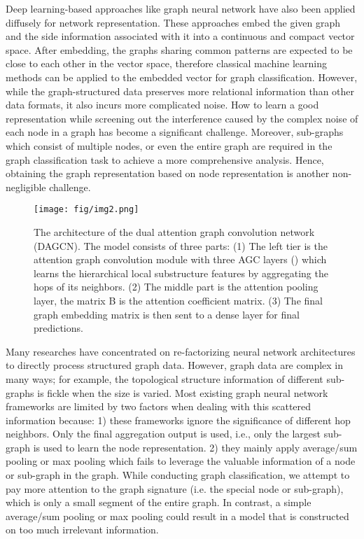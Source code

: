 \documentclass[conference]{IEEEtran}
\begin{document}
	     Deep learning-based approaches like graph neural network have also been applied diffusely for network representation. These approaches embed the given graph and the side information associated with it into a continuous and compact vector space. After embedding, the graphs sharing common patterns are expected to be close to each other in the vector space, therefore classical machine learning methods can be applied to the embedded vector for graph classification. However, while the graph-structured data preserves more relational information than other data formats, it also incurs more complicated noise. How to learn a good representation while screening out the interference caused by the complex noise of each node in a graph has become a significant challenge. Moreover, sub-graphs which consist of multiple nodes, or even the entire graph are required in the graph classification task to achieve a more comprehensive analysis. Hence, obtaining the graph representation based on node representation is another non-negligible challenge.
	     
	     \begin{figure*}
 	        \centering
 	        \texttt{[image: fig/img2.png]}
 	        \caption{The architecture of the dual attention graph convolution network (DAGCN). The model consists of three parts: (1) The left tier is the attention graph convolution module with three AGC layers () which learns the hierarchical local substructure features by aggregating the hops of its neighbors. (2) The middle part is the attention pooling layer, the matrix B is the attention coefficient matrix. (3) The final graph embedding matrix  is then sent to a dense layer for final predictions.}   
 	        \label{fig:architecture}
 	        
	    \end{figure*}
	     
	     Many researches have concentrated on re-factorizing neural network architectures to directly process structured graph data\cite{monti2017geometricb,pan2016tri,defferrard2016convolutional,velickovic2017graph,pan2015finding}. However, graph data are complex in many ways; for example, the topological structure information of different sub-graphs is fickle when the size is varied. Most existing graph neural network frameworks are limited by two factors when dealing with this scattered information because: 1) these frameworks ignore the significance of different hop neighbors. Only the final aggregation output is used, i.e., only the largest sub-graph is used to learn the node representation. 2) they mainly apply average/sum pooling or max pooling which fails to leverage the valuable information of a node or sub-graph in the graph. While conducting graph classification, we attempt to pay more attention to the graph signature \cite{lee2018graph} (i.e. the special node or sub-graph), which is only a small segment of the entire graph. In contrast, a simple average/sum pooling or max pooling could result in a model that is constructed on too much irrelevant information. 
	     
\end{document}
